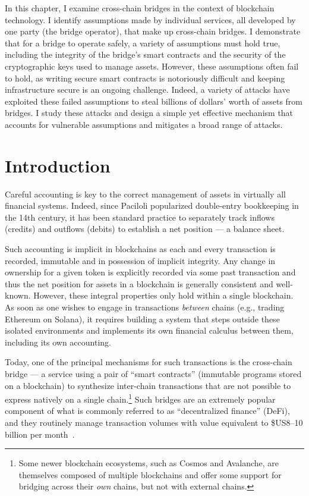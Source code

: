 
In this chapter, I examine cross-chain bridges in the context of blockchain technology. I identify assumptions made by individual services, all developed by one party (the bridge operator), that make up cross-chain bridges.
I demonstrate that for a bridge to operate safely, a variety of assumptions must hold true, including the integrity of the bridge's smart contracts and the security of the cryptographic keys used to manage assets.
However, these assumptions often fail to hold, as writing secure smart contracts is notoriously difficult and keeping infrastructure secure is an ongoing challenge. Indeed, 
a variety of attacks have exploited these failed assumptions to steal billions of dollars' worth of assets from bridges.
I study these attacks and design a simple yet effective mechanism that accounts for vulnerable assumptions and mitigates a broad range of attacks.


\section{Introduction}

Careful accounting is key to the correct management of assets in
virtually all financial systems.  Indeed, since Paciloli popularized
double-entry bookkeeping in the 14th century, it has been standard
practice to separately track inflows (credits) and outflows (debits)
to establish a net position --- a balance sheet.

Such accounting is implicit in blockchains as each and every
transaction is recorded, immutable and in possession of implicit
integrity.  Any change in ownership for a given token is explicitly
recorded via some past transaction and thus the net position for
assets in a blockchain is generally consistent and
well-known. However, these integral properties only hold within a
single blockchain.  As soon as one wishes to engage in transactions
\emph{between} chains (e.g., trading Ethereum on Solana), it
requires building a system that steps outside these isolated
environments and implements its own financial calculus between them,
including its own accounting.

Today, one of the principal mechanisms for such transactions is the
cross-chain bridge --- a service using a pair of ``smart contracts''
(immutable programs stored on a blockchain) to synthesize inter-chain
transactions that are not possible to express natively on a single
chain.\footnote{Some newer blockchain ecosystems, such as Cosmos and
  Avalanche, are themselves composed of multiple blockchains and offer
  some support for bridging across their \emph{own} chains, but not with external chains.}  Such bridges are an extremely popular component of what is
commonly referred to as ``decentralized finance'' (DeFi), and they
routinely manage transaction volumes with value equivalent to \$US8--10
billion per month~\cite{defillama-volume}.

